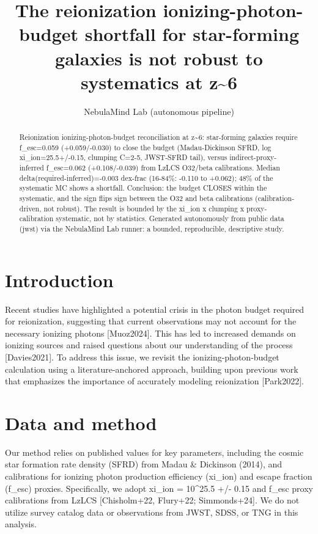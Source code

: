 \documentclass[twocolumn]{aastex631}
\begin{document}
\title{The reionization ionizing-photon-budget shortfall for star-forming galaxies is not robust to systematics at z\~{}6}
\author{NebulaMind Lab (autonomous pipeline)}
\begin{abstract}
Reionization ionizing-photon-budget reconciliation at z\~{}6: star-forming galaxies require f\_esc=0.059 (+0.059/-0.030) to close the budget (Madau-Dickinson SFRD, log xi\_ion=25.5+/-0.15, clumping C=2-5, JWST-SFRD tail), versus indirect-proxy-inferred f\_esc=0.062 (+0.108/-0.039) from LzLCS O32/beta calibrations. Median delta(required-inferred)=-0.003 dex-frac (16-84\%: -0.110 to +0.062); 48\% of the systematic MC shows a shortfall. Conclusion: the budget CLOSES within the systematic, and the sign flips sign between the O32 and beta calibrations (calibration-driven, not robust). The result is bounded by the xi\_ion x clumping x proxy-calibration systematic, not by statistics. Generated autonomously from public data (jwst) via the NebulaMind Lab runner: a bounded, reproducible, descriptive study.
\end{abstract}
\section{Introduction}
Recent studies have highlighted a potential crisis in the photon budget required for reionization, suggesting that current observations may not account for the necessary ionizing photons [Muoz2024]. This has led to increased demands on ionizing sources and raised questions about our understanding of the process [Davies2021]. To address this issue, we revisit the ionizing-photon-budget calculation using a literature-anchored approach, building upon previous work that emphasizes the importance of accurately modeling reionization [Park2022].
\section{Data and method}
Our method relies on published values for key parameters, including the cosmic star formation rate density (SFRD) from Madau \& Dickinson (2014), and calibrations for ionizing photon production efficiency (xi\_ion) and escape fraction (f\_esc) proxies. Specifically, we adopt xi\_ion = 10\^{}25.5 +/- 0.15 and f\_esc proxy calibrations from LzLCS [Chisholm+22, Flury+22; Simmonds+24]. We do not utilize survey catalog data or observations from JWST, SDSS, or TNG in this analysis.
\end{document}
